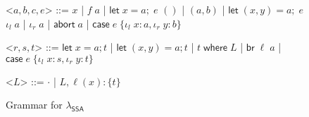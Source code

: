 \documentclass[acmsmall,screen,review]{acmart}
\newcounter{todos}
\newcommand{\TODO}[1]{{
  \stepcounter{todos}
  \begin{center}\large{\textcolor{red}{\textbf{TODO \arabic{todos}:} #1}}\end{center}
}}
\newcommand{\ms}[1]{\ensuremath{\mathsf{#1}}}
\newcommand{\lto}{:}
\newcommand{\linl}[1]{\iota_l\;{#1}}
\newcommand{\linr}[1]{\iota_r\;{#1}}
\newcommand{\labort}[1]{\ms{abort}\;{#1}}
\newcommand{\letexpr}[3]{\ensuremath{\ms{let}\;#1 = #2;\;#3}}
\newcommand{\caseexpr}[5]{\ms{case}\;#1\;\{\linl{#2} \lto #3, \linr{#4} \lto #5\}}
\newcommand{\letstmt}[3]{\ensuremath{\ms{let}\;#1 = #2; #3}}
\newcommand{\brb}[2]{\ms{br}\;#1\;#2}
\newcommand{\casestmt}[5]{\ms{case}\;#1\;\{\linl{#2} \lto #3, \linr{#4} \lto #5\}}
\newcommand{\where}[2]{#1\;\ms{where}\;#2}
\newcommand{\wbranch}[3]{#1(#2) \lto \{#3\}}
\newcommand{\teqv}{\approx}
\newcommand{\isotopessa}{\(\lambda_{\ms{SSA}}\)}
\begin{document}
\begin{figure}[H]
  \begin{center}
    \begin{grammar}
      <\(a, b, c, e\)> ::= \(x\) 
      \;|\;  \(f\;a\)
      \;|\; \(\letexpr{x}{a}{e}\)
      \alt  \(()\)
      \;|\; \((a, b)\)
      \;|\; \(\letexpr{(x, y)}{a}{e}\)
      \alt  \(\linl{a}\) 
      \;|\; \(\linr{a}\)
      \;|\; \(\labort{a}\)
      \;|\; \(\caseexpr{e}{x}{a}{y}{b}\)
      
      <\(r, s, t\)> ::= 
      \(\letstmt{x}{a}{t}\)
      \;|\; \(\letstmt{(x, y)}{a}{t}\)
      \;|\; \(\where{t}{L}\)
      \;|\; \(\brb{\ell}{a}\)
      \;|\; \(\casestmt{e}{x}{s}{y}{t}\)

      <\(L\)> ::= \(\cdot\) \;|\; \(L, \wbranch{\ell}{x}{t}\)
    \end{grammar}
  \end{center}
  \caption{Grammar for \isotopessa{}}
  \Description{}
  \label{fig:ssa-grammar}
\end{figure}


\end{document}
